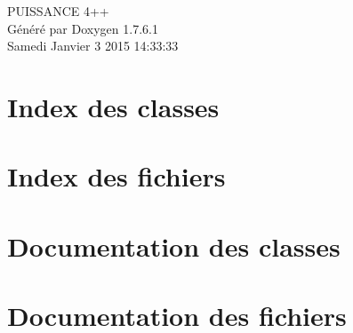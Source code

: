 \documentclass[a4paper]{book}
\begin{document}
\hypersetup{pageanchor=false,citecolor=blue}
\begin{titlepage}
\vspace*{7cm}
\begin{center}
{\Large \-P\-U\-I\-S\-S\-A\-N\-C\-E 4++ }\\
\vspace*{1cm}
{\large \-Généré par Doxygen 1.7.6.1}\\
\vspace*{0.5cm}
{\small Samedi Janvier 3 2015 14:33:33}\\
\end{center}
\end{titlepage}
\clearemptydoublepage
{}
\tableofcontents
\clearemptydoublepage
{}
\hypersetup{pageanchor=true,citecolor=blue}
\chapter{\-Index des classes}

\chapter{\-Index des fichiers}

\chapter{\-Documentation des classes}


\chapter{\-Documentation des fichiers}















\printindex
\end{document}
